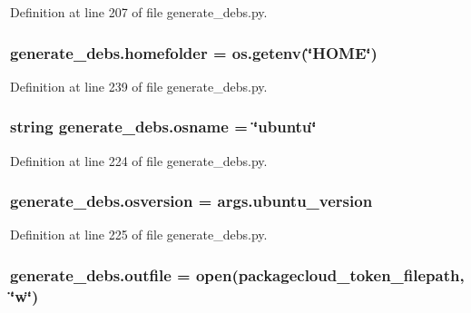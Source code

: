 Definition at line 207 of file generate\+\_\+debs.\+py.

\subsubsection[{\texorpdfstring{homefolder}{homefolder}}]{\setlength{\rightskip}{0pt plus 5cm}generate\+\_\+debs.\+homefolder = os.\+getenv(\char`\"{}H\+O\+ME\char`\"{})}\hypertarget{namespacegenerate__debs_aeb83979be2939a8059435a906a91f682}{}\label{namespacegenerate__debs_aeb83979be2939a8059435a906a91f682}


Definition at line 239 of file generate\+\_\+debs.\+py.

\subsubsection[{\texorpdfstring{osname}{osname}}]{\setlength{\rightskip}{0pt plus 5cm}string generate\+\_\+debs.\+osname = \char`\"{}ubuntu\char`\"{}}\hypertarget{namespacegenerate__debs_ad06322332de29cb27a40152d0cccc2ca}{}\label{namespacegenerate__debs_ad06322332de29cb27a40152d0cccc2ca}


Definition at line 224 of file generate\+\_\+debs.\+py.

\subsubsection[{\texorpdfstring{osversion}{osversion}}]{\setlength{\rightskip}{0pt plus 5cm}generate\+\_\+debs.\+osversion = args.\+ubuntu\+\_\+version}\hypertarget{namespacegenerate__debs_afd02fe6ead63bc5db5d3c3b9eb973b62}{}\label{namespacegenerate__debs_afd02fe6ead63bc5db5d3c3b9eb973b62}


Definition at line 225 of file generate\+\_\+debs.\+py.

\subsubsection[{\texorpdfstring{outfile}{outfile}}]{\setlength{\rightskip}{0pt plus 5cm}generate\+\_\+debs.\+outfile = open({\bf packagecloud\+\_\+token\+\_\+filepath}, \char`\"{}w\char`\"{})}\hypertarget{namespacegenerate__debs_aa1faa039b35b72ee44dc6f106ad12911}{}\label{namespacegenerate__debs_aa1faa039b35b72ee44dc6f106ad12911}


